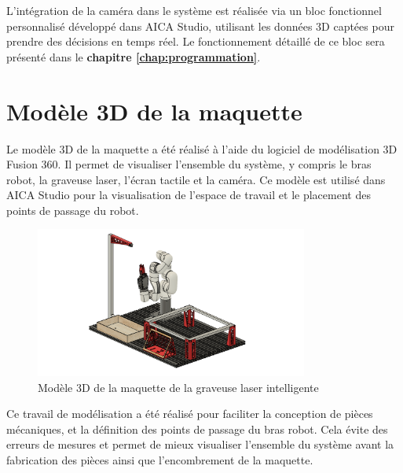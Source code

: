 L’intégration de la caméra dans le système est réalisée via un bloc fonctionnel personnalisé développé dans AICA Studio, utilisant les données 3D captées pour prendre des décisions en temps réel. Le fonctionnement détaillé de ce bloc sera présenté dans le \textbf{chapitre \ref{chap:programmation}}.

\section{Modèle 3D de la maquette}

Le modèle 3D de la maquette a été réalisé à l'aide du logiciel de modélisation 3D Fusion 360. Il permet de visualiser l'ensemble du système, y compris le bras robot, la graveuse laser, l'écran tactile et la caméra. Ce modèle est utilisé dans AICA Studio pour la visualisation de l'espace de travail et le placement des points de passage du robot.

\begin{figure}[H]
    \centering
    \includegraphics[width=0.8\textwidth]{assets/figures/modele_3d.png}
    \caption{Modèle 3D de la maquette de la graveuse laser intelligente}
    \label{fig:maquette_3d}
\end{figure}

Ce travail de modélisation a été réalisé pour faciliter la conception de pièces mécaniques, et la définition des points de passage du bras robot. Cela évite des erreurs de mesures et permet de mieux visualiser l'ensemble du système avant la fabrication des pièces ainsi que l'encombrement de la maquette.
